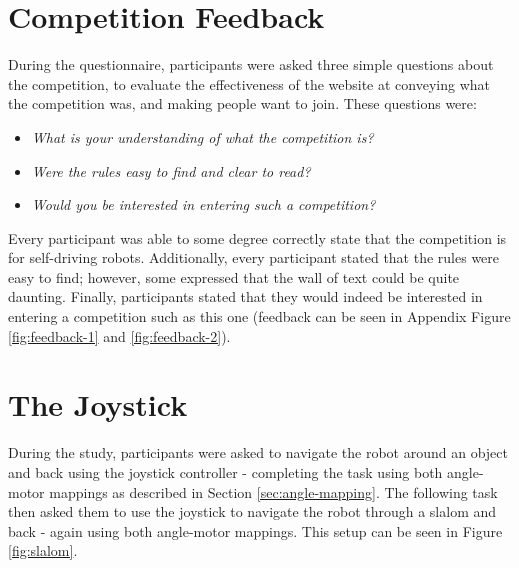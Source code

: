 \documentclass{l4proj}
\begin{document}
\section{Competition Feedback}
During the questionnaire, participants were asked three simple questions about the competition, to evaluate the effectiveness of the website at conveying what the competition was, and making people want to join. These questions were:
\begin{itemize}
    \item \textit{What is your understanding of what the competition is?}
    \item \textit{Were the rules easy to find and clear to read?}
    \item \textit{Would you be interested in entering such a competition?}
\end{itemize}

Every participant was able to some degree correctly state that the competition is for self-driving robots. Additionally, every participant stated that the rules were easy to find; however, some expressed that the wall of text could be quite daunting. Finally, participants stated that they would indeed be interested in entering a competition such as this one (feedback can be seen in Appendix Figure \ref{fig:feedback-1} and \ref{fig:feedback-2}).


\section{The Joystick}
During the study, participants were asked to navigate the robot around an object and back using the joystick controller - completing the task using both angle-motor mappings as described in Section \ref{sec:angle-mapping}. The following task then asked them to use the joystick to navigate the robot through a slalom and back - again using both angle-motor mappings. This setup can be seen in Figure \ref{fig:slalom}.
\end{document}
